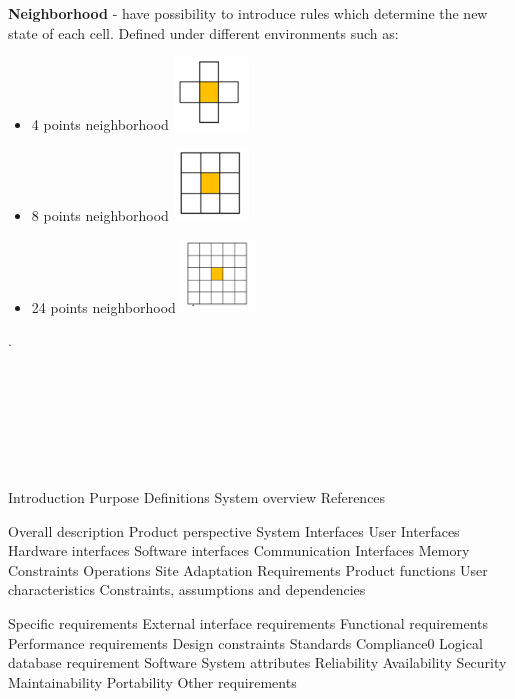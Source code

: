 \documentclass{article}
\begin{document}
\Large {\bf Neighborhood
} 
	-  have possibility to introduce rules which determine the new state of 
	each cell. Defined under different environments such as:
	\begin{itemize}
	
	\item	
		4 points neighborhood \hspace{35pt} 
			 \includegraphics[width=20mm]{images/4_neigh.png} \\
	

	
	\item	
		8 points neighborhood \hspace{35pt}
			\includegraphics[width=20mm]{images/8_neigh.png} \\
	
	\item	
		24 points neighborhood \hspace{35pt}
			\includegraphics[width=20mm]{images/24_neigh.png} \\				
	\end{itemize}




.\\\\\\\\\\\\\\\\Introduction
	Purpose
	Definitions
	System overview
	References
	
Overall description
	Product perspective
		System Interfaces
		User Interfaces
		Hardware interfaces
		Software interfaces
		Communication Interfaces
		Memory Constraints
		Operations
		Site Adaptation Requirements
	Product functions
	User characteristics
	Constraints, assumptions and dependencies
	
Specific requirements
	External interface requirements
	Functional requirements
	Performance requirements
	Design constraints
		Standards Compliance0
	Logical database requirement
	Software System attributes
		Reliability
		Availability
		Security
		Maintainability
		Portability
	Other requirements
\end{document}
